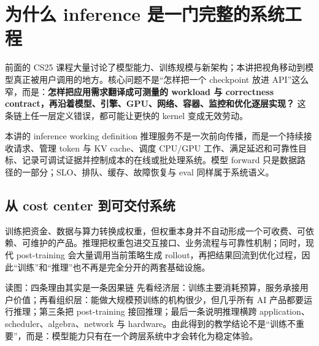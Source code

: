 \section{为什么 inference 是一门完整的系统工程}

前面的 CS25 课程大量讨论了模型能力、训练规模与新架构；本讲把视角移动到模型真正被用户调用的地方。核心问题不是“怎样把一个 checkpoint 放进 API”这么窄，而是：\textbf{怎样把应用需求翻译成可测量的 workload 与 correctness contract，再沿着模型、引擎、GPU、网络、容器、监控和优化逐层实现？} 这条链上任一层定义错误，都可能让更快的 kernel 变成无效劳动。


\begin{importantbox}{本讲的 inference working definition}
推理服务不是一次前向传播，而是一个持续接收请求、管理 token 与 KV cache、调度 CPU/GPU 工作、满足延迟和可靠性目标、记录可调试证据并控制成本的在线或批处理系统。模型 forward 只是数据路径的一部分；SLO、排队、缓存、故障恢复与 eval 同样属于系统语义。
\end{importantbox}


\subsection{从 cost center 到可交付系统}

训练把资金、数据与算力转换成权重，但权重本身并不自动形成一个可收费、可依赖、可维护的产品。推理把权重包进交互接口、业务流程与可靠性机制；同时，现代 post-training 会大量调用当前策略生成 rollout，再把结果回流到优化过程，因此“训练”和“推理”也不再是完全分开的两套基础设施。


\begin{knowledgebox}{读图：四条理由其实是一条因果链}
先看经济层：训练主要消耗预算，服务承接用户价值；再看组织层：能做大规模预训练的机构很少，但几乎所有 AI 产品都要运行推理；第三条把 post-training 接回推理；最后一条说明推理横跨 application、scheduler、algebra、network 与 hardware。由此得到的教学结论不是“训练不重要”，而是：模型能力只有在一个跨层系统中才会转化为稳定体验。
\end{knowledgebox}

